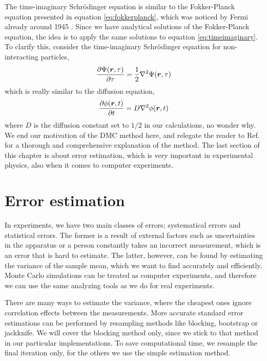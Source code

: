 The time-imaginary Schrödinger equation is similar to the Fokker-Planck equation presented in equation \eqref{eq:fokkerplanck}, which was noticed by Fermi already around 1945 \cite{metropolis_monte_1949,ceperley_quantum_1986}. Since we have analytical solutions of the Fokker-Planck equation, the idea is to apply the same solutions to equation \ref{eq:timeimaginary}. To clarify this, consider the time-imaginary Schrödinger equation for non-interacting particles,
\begin{equation}
\frac{\partial\Psi(\boldsymbol{{r}},\tau)}{\partial\tau}=\frac{1}{2}\nabla^2\Psi(\boldsymbol{{r}},\tau)
\end{equation}
which is really similar to the diffusion equation,
\begin{equation}
\frac{\partial\phi(\boldsymbol{{r}},t)}{\partial t}=D\nabla^2\phi(\boldsymbol{{r}},t)
\end{equation}
where $D$ is the diffusion constant set to $1/2$ in our calculations, no wonder why. We end our motivation of the DMC method here, and relegate the reader to Ref.\cite{kosztin_introduction_1996} for a thorough and comprehensive explanation of the method. The last section of this chapter is about error estimation, which is very important in experimental physics, also when it comes to computer experiments. 

\section{Error estimation} \label{sec:variance}
In experiments, we have two main classes of errors; systematical errors and statistical errors. The former is a result of external factors such as uncertainties in the apparatus or a person constantly takes an incorrect measurement, which is an error that is hard to estimate. The latter, however, can be found by estimating the variance of the sample mean, which we want to find accurately and efficiently. Monte Carlo simulations can be treated as computer experiments, and therefore we can use the same analyzing tools as we do for real experiments.

There are many ways to estimate the variance, where the cheapest ones ignore correlation effects between the measurements. More accurate standard error estimations can be performed by resampling methods like blocking, bootstrap or jackknife. We will cover the blocking method only, since we stick to that method in our particular implementations. To save computational time, we resample the final iteration only, for the others we use the simple estimation method.

